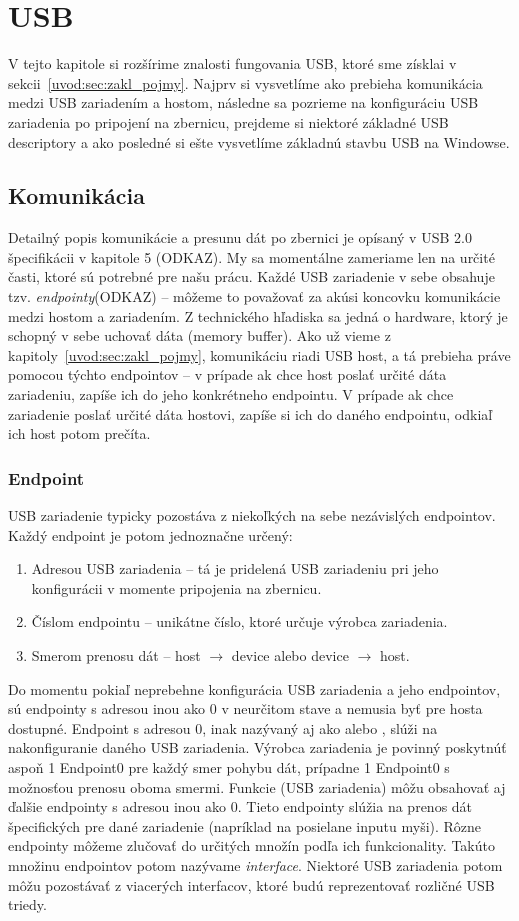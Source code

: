 \chapter{USB}
V tejto kapitole si rozšírime znalosti fungovania USB, ktoré sme získlai v sekcii~\ref{uvod:sec:zakl_pojmy}. Najprv si vysvetlíme ako prebieha komunikácia medzi USB zariadením a hostom, následne sa pozrieme na konfiguráciu USB zariadenia po pripojení na zbernicu, prejdeme si niektoré základné USB descriptory a ako posledné si ešte vysvetlíme základnú stavbu USB na Windowse.

\section{Komunikácia}
Detailný popis komunikácie a presunu dát po zbernici je opísaný v USB 2.0 špecifikácii v kapitole 5 (ODKAZ). My sa momentálne zameriame len na určité časti, ktoré sú potrebné pre našu prácu. Každé USB zariadenie v sebe obsahuje tzv. \textit{endpointy}(ODKAZ) -- môžeme to považovať za akúsi koncovku komunikácie medzi hostom a zariadením. Z technického hľadiska sa jedná o hardware, ktorý je schopný v sebe uchovať dáta (memory buffer). Ako už vieme z kapitoly~\ref{uvod:sec:zakl_pojmy}, komunikáciu riadi USB host, a tá prebieha práve pomocou týchto endpointov -- v prípade ak chce host poslať určité dáta zariadeniu, zapíše ich do jeho konkrétneho endpointu. V prípade ak chce zariadenie poslať určité dáta hostovi, zapíše si ich do daného endpointu, odkiaľ ich host potom prečíta.

\subsection*{Endpoint}
USB zariadenie typicky pozostáva z niekoľkých na sebe nezávislých endpointov. Každý endpoint je potom jednoznačne určený:
\begin{enumerate}
\item Adresou USB zariadenia -- tá je pridelená USB zariadeniu pri jeho konfigurácii v momente pripojenia na zbernicu.
\item Číslom endpointu -- unikátne číslo, ktoré určuje výrobca zariadenia.
\item Smerom prenosu dát -- host $\longrightarrow$ device alebo device $\longrightarrow$ host.
\end{enumerate}

Do momentu pokiaľ neprebehne konfigurácia USB zariadenia a jeho endpointov, sú endpointy s adresou inou ako 0 v neurčitom stave a nemusia byť pre hosta dostupné. Endpoint s adresou 0, inak nazývaný aj ako  alebo , slúži na nakonfiguranie daného USB zariadenia. Výrobca zariadenia je povinný poskytnúť aspoň 1 Endpoint0 pre každý smer pohybu dát, prípadne 1 Endpoint0 s možnosťou prenosu oboma smermi. Funkcie (USB zariadenia) môžu obsahovať aj ďalšie endpointy s adresou inou ako 0. Tieto endpointy slúžia na prenos dát špecifických pre dané zariadenie (napríklad na posielane inputu myši). Rôzne endpointy môžeme zlučovať do určitých množín podľa ich funkcionality. Takúto množinu endpointov potom nazývame \textit{interface}. Niektoré USB zariadenia potom môžu pozostávať z viacerých interfacov, ktoré budú reprezentovať rozličné USB triedy.

